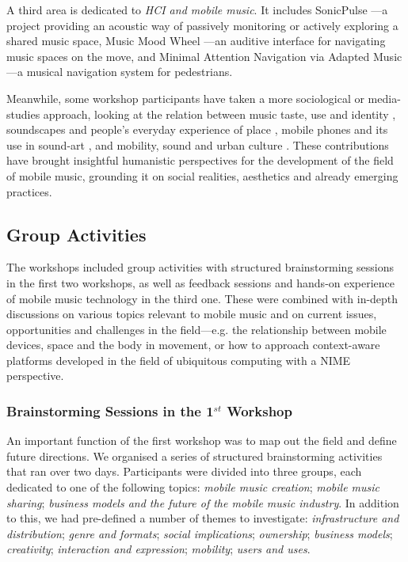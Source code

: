 A third area is dedicated to \textit{HCI and mobile music}. It includes
SonicPulse \cite{Anttila:2006}---a project providing an acoustic way of passively monitoring or
actively exploring a shared music space, Music Mood Wheel \cite{Andric:2006}---an auditive
interface for navigating music spaces on the move, and Minimal Attention
Navigation via Adapted Music \cite{Hunt:2006}---a musical navigation system for pedestrians.

Meanwhile, some workshop participants have taken a more sociological or
media-studies approach, looking at the relation between music taste, use and
identity \cite{DArcangelo:2005}, soundscapes and people's everyday experience of place \cite{Phillips:2006}, mobile
phones and its use in sound-art \cite{Behrendt:2004}, and mobility, sound and urban culture \cite{Bull:2001}.
These contributions have brought insightful humanistic perspectives for the
development of the field of mobile music, grounding it on social realities,
aesthetics and already emerging practices.

\subsection{Group Activities}

The workshops included group activities with structured brainstorming sessions
in the first two workshops, as well as feedback sessions and hands-on experience
of mobile music technology in the third one. These were combined with in-depth
discussions on various topics relevant to mobile music and on current issues,
opportunities and challenges in the field---e.g. the relationship between mobile
devices, space and the body in movement, or how to approach context-aware
platforms developed in the field of ubiquitous computing with a NIME perspective.

\subsubsection{Brainstorming Sessions in the 1$^{st}$ Workshop}

An important function of the first workshop was to map out the field and define
future directions. We organised a series of structured brainstorming activities
that ran over two days. Participants were divided into three groups, each
dedicated to one of the following topics: \textit{mobile music creation};
\textit{mobile music sharing}; \textit{business models and the future of the
mobile music industry}. In addition to this, we had pre-defined a number of
themes to investigate: \textit{infrastructure and distribution}; \textit{genre
and formats}; \textit{social implications}; \textit{ownership}; \textit{business
models}; \textit{creativity}; \textit{interaction and expression};
\textit{mobility}; \textit{users and uses}.

